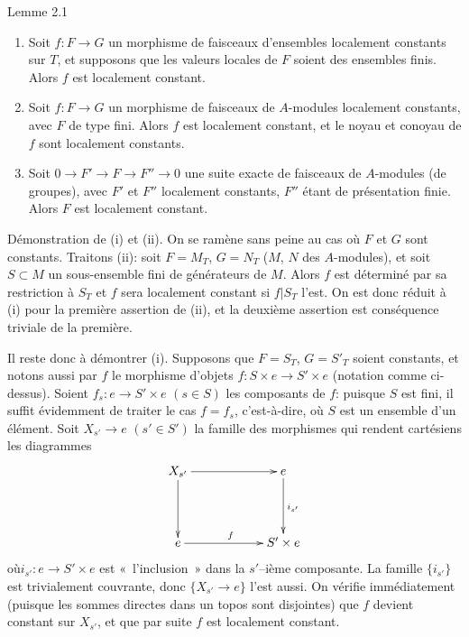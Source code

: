\documentclass[10pt]{../fichiers-configuration-latex/smfart}
\begin{document}
\begin{enonce*}{Lemme 2.1}
\begin{enumerate}
\renewcommand{\theenumi}{\roman{enumi}}
\renewcommand{\labelenumi}{(\theenumi)}
\item Soit $f:F\rightarrow G$ un morphisme de faisceaux d'ensembles
  localement constants sur $T$, et supposons que les valeurs locales de
  $F$ soient des ensembles finis. Alors $f$ est localement constant.

\item Soit $f:F\rightarrow G$ un morphisme de faisceaux de $A$-modules
  localement constants, avec $F$ de type fini. Alors $f$ est
  localement constant, et le noyau et conoyau de $f$ sont localement
  constants.

\item Soit $0\rightarrow F'\rightarrow F\rightarrow F''\rightarrow 0$
  une suite exacte de faisceaux de $A$-modules (\resp de groupes),
  avec $F'$ et $F''$ localement constants, $F''$ étant de présentation
  finie. Alors $F$ est localement constant.
\end{enumerate}
\end{enonce*}

Démonstration de (i) et (ii). On se ramène sans peine au cas où $F$ et
$G$ sont constants. Traitons (ii): soit $F=M_T$, $G=N_T$ ($M$, $N$ des
$A$-modules), et soit $S\subset M$ un sous-ensemble fini de
générateurs de $M$. Alors $f$ est déterminé par sa restriction à $S_T$
et $f$ sera localement constant si $f|S_T$ l'est. On est donc
réduit à (i) pour la première assertion de (ii), et la deuxième
assertion est conséquence triviale de la première.

Il reste donc à démontrer (i). Supposons que $F=S_T$, $G={S'}_T$
soient constants, et notons aussi par $f$ le morphisme d'objets
$f:S\times e\rightarrow S'\times e$ (notation comme ci-dessus). Soient
$f_s:e\rightarrow S'\times e$ $(s\in S)$ les composants de $f$: puisque
$S$ est fini, il suffit évidemment de traiter le cas $f=f_s$,
c'est-à-dire, où $S$ est un ensemble d'un élément. Soit
$X_{s'}\rightarrow e$ $(s'\in S')$ la famille des morphismes qui rendent
cartésiens les diagrammes
$$
\xymatrix@C=2cm@R=1.5cm{
X_{s'} \ar[r] \ar[d]& e\ar[d]^{i_{s'}}\\
e   \ar[r]^{f}   & S'\times e
}
$$
où\pageoriginale $i_{s'}:e\rightarrow S'\times e$ est
« l'inclusion » dans la $s'$--ième composante. La famille $\{i_{s'}\}$ est
trivialement couvrante, donc $\{X_{s'}\rightarrow e\}$ l'est aussi. On
vérifie immédiatement (puisque les sommes directes dans un topos sont
disjointes) %
que $f$ devient constant sur $X_{s'}$, et que par suite $f$
est localement constant.
\end{document}
